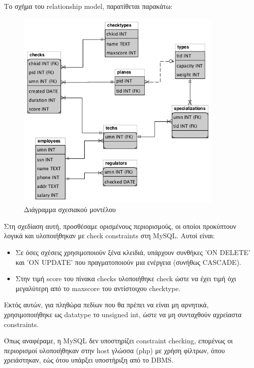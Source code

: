 \documentclass[a4paper]{article}
\begin{document}
Το σχήμα του relationship model, παρατίθεται παρακάτω:

\begin{figure}[h]
\centering
\includegraphics[width=0.9\textwidth]{files/r-db.png}
\caption{Διάγραμμα σχεσιακού μοντέλου}
\end{figure}

Στη σχεδίαση αυτή, προσθέσαμε ορισμένους περιορισμούς, οι οποίοι προκύπτουν
λογικά και υλοποιήθηκαν με check constraints στη MySQL. Αυτοί είναι:

\begin{itemize}
\item Σε όσες σχέσεις χρησιμοποιούν ξένα κλειδιά, υπάρχουν συνθήκες 'ON
DELETE' και 'ON UPDATE' που πραγματοποιούν μια ενέργεια (συνήθως CASCADE).
\item Στην τιμή score του πίνακα checks υλοποιήθηκε check ώστε να έχει τιμή
όχι μεγαλύτερη από το maxscore του αντίστοιχου checktype.
\end{itemize}

Εκτός αυτών, για πληθώρα πεδίων που θα πρέπει να είναι μη αρνητικά,
χρησιμοποιήθηκε ως datatype το unsigned int, ώστε να μη συνταχθούν αχρείαστα
constraints.

Όπως αναφέραμε, η MySQL δεν υποστηρίζει constraint checking, επομένως οι
περιορισμοί υλοποιήθηκαν στην host γλώσσα (php) με χρήση φίλτρων, όπου
χρειάστηκαν, εώς ότου υπάρξει υποστήριξη από το DBMS.

\end{document}
